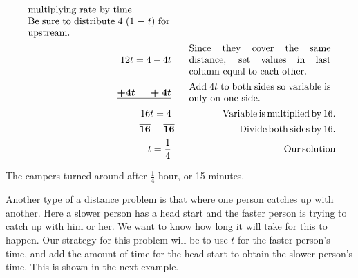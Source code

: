 \begin{example}
\begin{eqnarray*}
\begin{array}{p{0.425\textwidth}}
      \tmop{multiplying} \tmop{rate} \tmop{by} \tmop{time}.\\
			\tmop{Be} \tmop{sure} \tmop{to} \tmop{distribute} 4 (1 $-~t$) \tmop{for} \tmop{upstream}. %
    \end{array}\\
    12 t = 4 - 4 t~ &  & \begin{array}{p{0.425\textwidth}}
		\tmop{Since} \tmop{they} \tmop{cover} \tmop{the} \tmop{same} \tmop{distance}, \tmop{set} \tmop{values} \tmop{in} \tmop{last} \tmop{column} \tmop{equal} \tmop{to} \tmop{each} \tmop{other}.
		\end{array}\\
    \tmmathbf{\underline{+ 4 t ~~~~+ 4 t}}~ &  & \begin{array}{p{0.425\textwidth}}\tmop{Add} $4t$ \tmop{to} \tmop{both} \tmop{sides} \tmop{so} \tmop{variable} \tmop{is} \tmop{only} \tmop{on} \tmop{one} \tmop{side}.
		\end{array}\\
    16 t = 4~ &  & \tmop{~Variable} \tmop{is} \tmop{multiplied} \tmop{by} 16.\\
    \tmmathbf{\overline{16} ~~~~ \overline{16}} &  & \tmop{~Divide} \tmop{both}
    \tmop{sides} \tmop{by} 16.\\
    t = \frac{1}{4}~ &  & \tmop{~Our} \tmop{solution}
  \end{eqnarray*}
\begin{center}
 The campers turned around after $\frac{1}{4}$ hour, or 15 minutes.
\end{center}
\end{example}

Another type of a distance problem is that where one person catches up with another. Here a slower person has a head start and the faster person is trying to catch up with him or her.  We want to know how long it
will take for this to happen. Our strategy for this problem will be to
use $t$ for the faster person's time, and add the amount of time for the head start to obtain the slower person's time. This is shown in the next example.

\pagebreak

